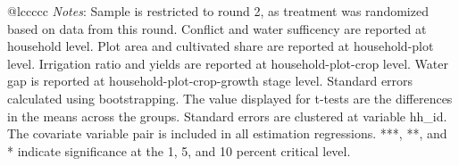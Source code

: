 \documentclass{article}
\begin{document}
\begin{table}[!htbp]
\begin{adjustbox}{max width=\textwidth}
\begin{tabular}{@{\extracolsep{5pt}}lccccc}
{\textit{Notes}: Sample is restricted to round 2, as treatment was randomized based on data from this round. Conflict and water sufficency are reported at household level. Plot area and cultivated share are reported at household-plot level. Irrigation ratio and yields are reported at household-plot-crop level. Water gap is reported at household-plot-crop-growth stage level. Standard errors calculated using bootstrapping. The value displayed for t-tests are the differences in the means across the groups. Standard errors are clustered at variable hh\_id. The covariate variable pair is included in all estimation regressions. ***, **, and * indicate significance at the 1, 5, and 10 percent critical level. }
\end{tabular}
\end{adjustbox}
\end{table}
\end{document}
